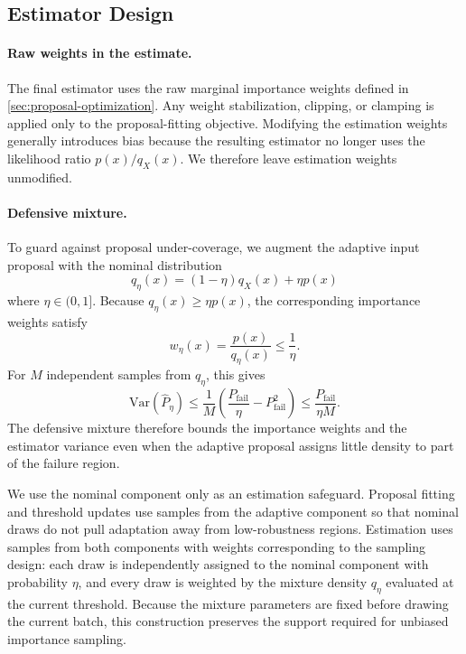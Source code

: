 \documentclass[twoside,11pt]{article}
\begin{document}


\subsection{Estimator Design}
\label{sec:estimator}

\paragraph{Raw weights in the estimate.} 
The final estimator uses the raw marginal importance weights defined in \cref{sec:proposal-optimization}. Any weight stabilization, clipping, or clamping is applied only to the proposal-fitting objective. Modifying the estimation weights generally introduces bias because the resulting estimator no longer uses the likelihood ratio $p(x)/q_X(x)$. We therefore leave estimation weights unmodified.

\paragraph{Defensive mixture.}
To guard against proposal under-coverage, we augment the adaptive input proposal with the nominal distribution
\[
    q_\eta(x)
    =
    (1-\eta)q_X(x)
    +
    \eta p(x)
\]
where $\eta\in(0,1]$. Because $q_\eta(x)\geq\eta p(x)$, the corresponding importance weights satisfy
\[
    w_\eta(x)
    =
    \frac{p(x)}{q_\eta(x)}
    \leq
    \frac{1}{\eta}.
\]
For $M$ independent samples from $q_\eta$, this gives
\[
    \mathrm{Var}(\hat{P}_\eta)
    \leq
    \frac{1}{M}
    \left(
        \frac{P_{\mathrm{fail}}}{\eta}
        -
        P_{\mathrm{fail}}^2
    \right)
    \leq
    \frac{P_{\mathrm{fail}}}{\eta M}.
\]
The defensive mixture therefore bounds the importance weights and the estimator variance even when the adaptive proposal assigns little density to part of the failure region.

We use the nominal component only as an estimation safeguard. Proposal fitting and threshold updates use samples from the adaptive component so that nominal draws do not pull adaptation away from low-robustness regions. Estimation uses samples from both components with weights corresponding to the sampling design: each draw is independently assigned to the nominal component with probability $\eta$, and every draw is weighted by the mixture density $q_\eta$ evaluated at the current threshold. Because the mixture parameters are fixed before drawing the current batch, this construction preserves the support required for unbiased importance sampling.
\end{document}
